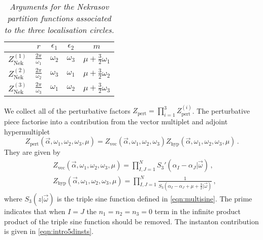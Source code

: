 \documentclass[main.tex]{subfiles}
\begin{document}
\begin{table}
\centering
\begin{tabular}{|c c c c c|} 
 \hline
 & $r$ & $\epsilon_1$ & $\epsilon_2$ & $m$ \\ [0.5ex] 
 \hline\hline
  $Z^{(1)}_{\text{Nek}}$ & $\frac{2\pi}{\omega_1}$ & $\omega_2$ & $\omega_3$ &$\mu+\frac{3}{2}\omega_1$ \\ 
  $Z^{(2)}_{\text{Nek}}$ & $\frac{2\pi}{\omega_2}$ & $\omega_3$ & $\omega_1$ &$\mu+\frac{3}{2}\omega_2$ \\ 
    $Z^{(3)}_{\text{Nek}}$ & $\frac{2\pi}{\omega_3}$ & $\omega_1$ & $\omega_2$ &$\mu+\frac{3}{2}\omega_3$ \\ 
 \hline
\end{tabular}
\caption{\it Arguments for the Nekrasov partition functions associated to the three localisation circles.}
\label{table:localisationparams}
\end{table}
We collect all of the perturbative factors $Z_{\text{pert}}=\prod_{i=1}^3Z^{(i)}_{\text{pert}}$.
The perturbative piece factorise into a contribution from the vector multiplet and adjoint hypermultiplet 
\begin{equation}\label{eqn:pertcont}
Z_{\text{pert}}\left(\vec{\alpha},\omega_1,\omega_2,\omega_3,\mu\right)=Z_{\text{vec}}\left(\vec{\alpha},\omega_1,\omega_2,\omega_3\right)Z_{\text{hyp}}\left(\vec{\alpha},\omega_1,\omega_2,\omega_3,\mu\right)\,.
\end{equation}
They are given by \cite{Kim:2012ava,Lockhart:2012vp,Kim:2012qf} 
\begin{align}
&Z_{\text{vec}}\left(\vec{\alpha},\omega_1,\omega_2,\omega_3,\mu\right)=\prod_{I,J=1}^NS_3'\left(\alpha_I-\alpha_J|\vec{\omega}\right)\,,\\ &Z_{\text{hyp}}\left(\vec{\alpha},\omega_1,\omega_2,\omega_3,\mu\right)=\prod_{I,J=1}^N\frac{1}{S_3\left(\alpha_I-\alpha_J+\mu+\frac{3}{2}|\vec{\omega}\right)}\,,
\end{align}
where $S_3(z|\vec{\omega})$ is the triple sine function defined in \eqref{eqn:multisine}.
The prime indicates that when $I=J$ the $n_1=n_2=n_3=0$ term in the infinite product product of the triple sine function should be removed. The instanton contribution is given in \eqref{eqn:intro5dinsts}.
\end{document}
